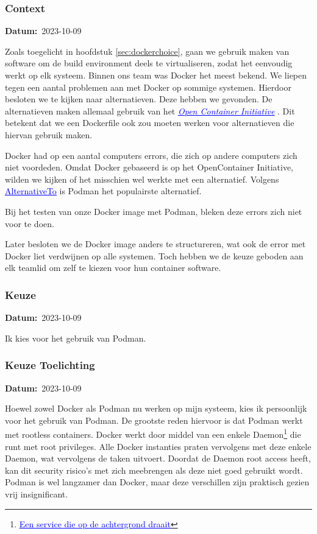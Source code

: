 \documentclass[a4paper]{report}
\newcommand{\styledhref}[2]{%
    \href{#1}{\textcolor{blue}{\underline{#2}}} %
}
\newcommand{\timestamp}[1]{
  \mbox{\scriptsize \textbf{Datum:} #1} \smallbreak
}
\begin{document}
\subsubsection{Context}
\timestamp{2023-10-09}
Zoals toegelicht in hoofdstuk \ref{sec:dockerchoice}, gaan we gebruik maken van software om de build environment deels te virtualiseren, zodat het eenvoudig werkt op elk systeem.
Binnen ons team was Docker het meest bekend. We liepen tegen een aantal problemen aan met Docker op sommige systemen. 
Hierdoor besloten we te kijken naar alternatieven. Deze hebben we gevonden. De alternatieven maken allemaal gebruik van het \styledhref{https://opencontainers.org/}{\textit{Open Container Initiative}}.
Dit betekent dat we een Dockerfile ook zou moeten werken voor alternatieven die hiervan gebruik maken.
\par\smallskip
Docker had op een aantal computers errors, die zich op andere computers zich niet voordeden. 
Omdat Docker gebaseerd is op het OpenContainer Initiative, wilden we kijken of het misschien wel werkte met een alternatief.
Volgens \styledhref{https://alternativeto.net/software/docker/}{AlternativeTo} is Podman het populairste alternatief.
\par\smallskip
Bij het testen van onze Docker image met Podman, bleken deze errors zich niet voor te doen.
\par\smallskip 
Later besloten we de Docker image anders te structureren, wat ook de error met Docker liet verdwijnen op alle systemen. 
Toch hebben we de keuze geboden aan elk teamlid om zelf te kiezen voor hun container software.

\subsubsection{Keuze}
\timestamp{2023-10-09}
Ik kies voor het gebruik van Podman.

\subsubsection{Keuze Toelichting}
\timestamp{2023-10-09}
Hoewel zowel Docker als Podman nu werken op mijn systeem, kies ik persoonlijk voor het gebruik van Podman.
De grootste reden hiervoor is dat Podman werkt met rootless containers. Docker werkt door middel van een enkele Daemon\footnote{\styledhref{https://www.techtarget.com/whatis/definition/daemon}{Een service die op de achtergrond draait} } die runt met root privileges. 
Alle Docker instanties praten vervolgens met deze enkele Daemon, wat vervolgens de taken uitvoert. Doordat de Daemon root access heeft, kan dit security risico's met zich meebrengen als deze niet goed gebruikt wordt\cite{dockerdaemonrisks}.
Podman is wel langzamer dan Docker, maar deze verschillen zijn praktisch gezien vrij insignificant\cite{dockerperformance}.
\end{document}
